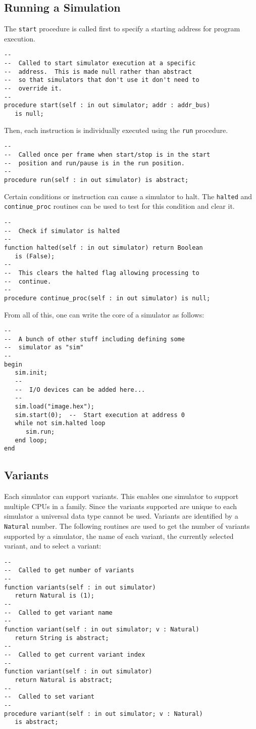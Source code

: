 \documentclass[10pt, openany]{book}
\begin{document}
\subsection{Running a Simulation}
The \verb|start| procedure is called first to specify a starting address for program execution.
\begin{lstlisting}
--
--  Called to start simulator execution at a specific
--  address.  This is made null rather than abstract
--  so that simulators that don't use it don't need to
--  override it.
--
procedure start(self : in out simulator; addr : addr_bus)
   is null;
\end{lstlisting}
Then, each instruction is individually executed using the \verb|run| procedure.
\begin{lstlisting}
--
--  Called once per frame when start/stop is in the start
--  position and run/pause is in the run position.
--
procedure run(self : in out simulator) is abstract;
\end{lstlisting}
Certain conditions or instruction can cause a simulator to halt.  The \verb|halted| and \verb|continue_proc| routines can be used to test for this condition and clear it.
\begin{lstlisting}
--
--  Check if simulator is halted
--
function halted(self : in out simulator) return Boolean
   is (False);
--
--  This clears the halted flag allowing processing to
--  continue.
--
procedure continue_proc(self : in out simulator) is null;
\end{lstlisting}
From all of this, one can write the core of a simulator as follows:
\begin{lstlisting}
--
--  A bunch of other stuff including defining some
--  simulator as "sim"
--
begin
   sim.init;
   --
   --  I/O devices can be added here...
   --
   sim.load("image.hex");
   sim.start(0);  --  Start execution at address 0
   while not sim.halted loop
      sim.run;
   end loop;
end
\end{lstlisting}

\subsection{Variants}
Each simulator can support variants.  This enables one simulator to support multiple CPUs in a family.  Since the variants supported are unique to each simulator a universal data type cannot be used.  Variants are identified by a \verb|Natural| number.  The following routines are used to get the number of variants supported by a simulator, the name of each variant, the currently selected variant, and to select a variant:
\begin{lstlisting}
--
--  Called to get number of variants
--
function variants(self : in out simulator)
   return Natural is (1);
--
--  Called to get variant name
--
function variant(self : in out simulator; v : Natural)
   return String is abstract;
--
--  Called to get current variant index
--
function variant(self : in out simulator)
   return Natural is abstract;
--
--  Called to set variant
--
procedure variant(self : in out simulator; v : Natural)
   is abstract;
\end{lstlisting}
\end{document}
